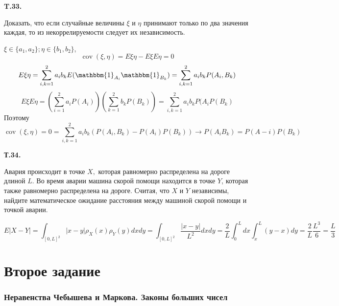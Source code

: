 \documentclass[a4paper,12pt]{article} %
\begin{document}
\begin{example}\textbf{T.33. }


Доказать, что если случайные величины $\xi$ и $\eta$ принимают только
по два значения каждая, то из некоррелируемости следует их независимость.


$ \xi\in \{a_1, a_2\}; \eta \in \{b_1, b_2\}$,
\[ \operatorname{cov}(\xi,\eta)= E\xi\eta -E\xi E\eta=0 \]
\[ E\xi\eta =\sum_{i,k=1}^{2}a_ib_k E(\mathbbm{1}_{A_i} \mathbbm{1}_{B_k})=
\sum_{i,k=1}^{2} a_ib_k P(A_i, B_k)
\]
\[ E\xi E\eta = (
\sum_{i=1}^{2} a_i P(A_i))
(\sum_{k=1}^{2} b_k P( B_k))=
\sum_{i,k=1}^{2} a_ib_k P(A_i P(B_k) \]
Поэтому 
\[ \operatorname{cov}(\xi,\eta)=0=
\sum_{i,k=1}^{2} a_ib_k (P(A_i, B_k)-P(A_i)P(B_k)) \rightarrow P(A_iB_k)=P(A-i)P(B_k)\]


\end{example}





\begin{example} \textbf{Т.34. }


Авария происходит в точке $X,$ которая равномерно распределена на дороге длиной $L .$ 
Во время аварии машина скорой помощи находится в точке $Y$, которая также равномерно распределена на дороге. 
Считая, что $X$ и $Y$ независимы, найдите математическое ожидание расстояния между машиной скорой помощи и точкой аварии.


\[ E|X-Y|= \int_{[0,L]^2} |x-y| \rho_X (x) \rho_Y(y) dx dy = 
\int_{[0,L]^2} \frac{|x-y|}{L^2} dx dy=\frac{2}{L}\int_0^L dx \int_{x}^{L} (y-x) dy =\frac{2}{L}\frac{L^3}{6} =\frac{L}{3} \]








\end{example}














\clearpage
\part{Второе задание}






\section{Неравенства Чебышева и Маркова. Законы больших чисел}
\end{document}
